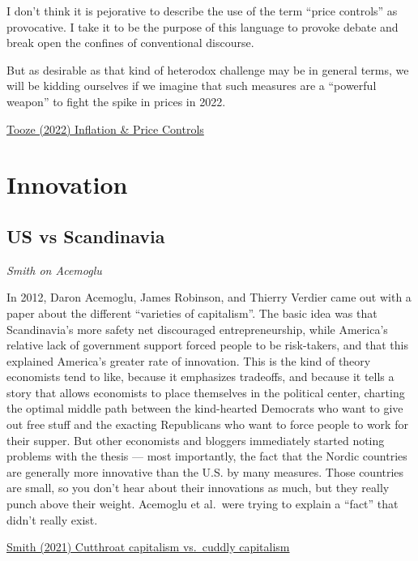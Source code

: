 \documentclass[
]{book}
\begin{document}
I don't think it is pejorative to describe the use of the term ``price controls'' as provocative. I take it to be the purpose of this language to provoke debate and break open the confines of conventional discourse.

But as desirable as that kind of heterodox challenge may be in general terms, we will be kidding ourselves if we imagine that such measures are a ``powerful weapon'' to fight the spike in prices in 2022.

\href{https://adamtooze.substack.com/p/top-links-65-inflation-and-price}{Tooze (2022) Inflation \& Price Controls}

\hypertarget{innovation}{%
\chapter{Innovation}\label{innovation}}

\hypertarget{us-vs-scandinavia}{%
\section{US vs Scandinavia}\label{us-vs-scandinavia}}

\emph{Smith on Acemoglu}

In 2012, Daron Acemoglu, James Robinson, and Thierry Verdier came out with a paper about the different ``varieties of capitalism''. The basic idea was that Scandinavia's more safety net discouraged entrepreneurship, while America's relative lack of government support forced people to be risk-takers, and that this explained America's greater rate of innovation. This is the kind of theory economists tend to like, because it emphasizes tradeoffs, and because it tells a story that allows economists to place themselves in the political center, charting the optimal middle path between the kind-hearted Democrats who want to give out free stuff and the exacting Republicans who want to force people to work for their supper. But other economists and bloggers immediately started noting problems with the thesis --- most importantly, the fact that the Nordic countries are generally more innovative than the U.S. by many measures. Those countries are small, so you don't hear about their innovations as much, but they really punch above their weight. Acemoglu et al.~were trying to explain a ``fact'' that didn't really exist.

\href{https://noahpinion.substack.com/p/cutthroat-capitalism-vs-cuddly-capitalism}{Smith (2021) Cutthroat capitalism vs.~cuddly capitalism}
\end{document}
